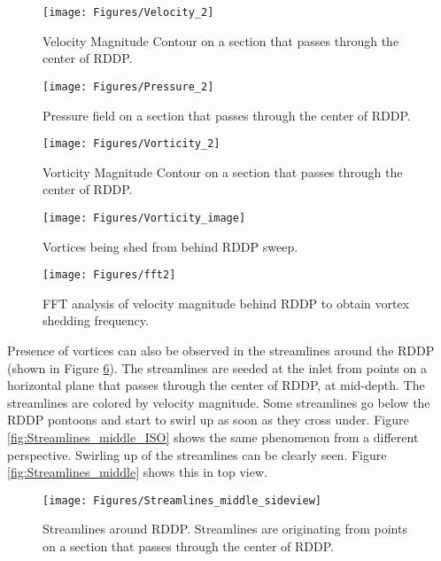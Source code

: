 \begin{figure}
\centering
\texttt{[image: Figures/Velocity\_2]}
\caption{\label{fig:Vel_Mag_middle}Velocity Magnitude Contour on a section that passes through the center of RDDP.}
\end{figure}

\begin{figure}
\centering
\texttt{[image: Figures/Pressure\_2]}
\caption{\label{fig:Pressure_middle}Pressure field on a section that passes through the center of RDDP.}
\end{figure}

\begin{figure}
\centering
\texttt{[image: Figures/Vorticity\_2]}
\caption{\label{fig:Vorticity_Mag_middle}Vorticity Magnitude Contour on a section that passes through the center of RDDP.}
\end{figure}

\begin{figure}
\centering
\texttt{[image: Figures/Vorticity\_image]}
\caption{\label{fig:Vorticity_image}Vortices being shed from behind RDDP sweep.}
\end{figure}


\begin{figure}
\centering
\texttt{[image: Figures/fft2]}
\caption{\label{fig:fft}FFT analysis of velocity magnitude behind RDDP to obtain vortex shedding frequency.}
\end{figure}

\noindent Presence of vortices can also be observed in the streamlines around the RDDP (shown in Figure \ref{fig:Streamlines_middle_sideview}). The streamlines are seeded at the inlet from points on a horizontal plane that passes through the center of RDDP, at mid-depth. The streamlines are colored by velocity magnitude. Some streamlines go below the RDDP pontoons and start to swirl up as soon as they cross under. Figure \ref{fig:Streamlines_middle_ISO} shows the same phenomenon from a different perspective. Swirling up of the streamlines can be clearly seen. Figure \ref{fig:Streamlines_middle} shows this in top view. \\

\begin{figure}
\centering
\texttt{[image: Figures/Streamlines\_middle\_sideview]}
\caption{\label{fig:Streamlines_middle_sideview}Streamlines around RDDP. Streamlines are originating from points on a section that passes through the center of RDDP.}
\end{figure}

